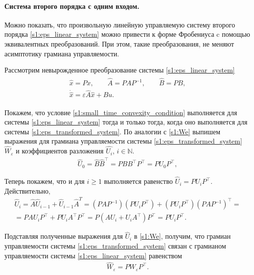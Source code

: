 \documentclass[../main.tex]{subfiles}
\begin{document}
\paragraph{Система второго порядка с одним входом.}
Можно показать, что произвольную линейную управляемую систему второго порядка \eqref{s1:eps_linear_system} можно привести к форме Фробениуса c помощью эквивалентных преобразований.
При этом, такие преобразования, не меняют асимптотику грамиана управляемости.

Рассмотрим невырожденное преобразование системы \eqref{s1:eps_linear_system}
\begin{gather}\label{s1:eps_transformed_system}
\begin{gathered}
	\hat{x} = P x, \qquad \hat{A} = P A P^{-1}, \qquad \hat{B} = P B, \\
	\dot{\hat{x}} = \varepsilon \hat{A} \hat{x} + \hat{B} u. 
\end{gathered}
\end{gather}

Покажем, что условие \eqref{s1:small_time_convexity_condition} выполняется для системы \eqref{s1:eps_linear_system} тогда и только тогда, когда оно выполняется для системы \eqref{s1:eps_transformed_system}.
 По аналогии с \eqref{s1:We} выпишем выражения для грамиана управляемости системы \eqref{s1:eps_transformed_system} $\hat{W}_{\varepsilon}$  и коэффициентов разложения $\hat{U_i}$, $i \in \mathbb{N}$.
\begin{gather*}
	\hat{U}_0 = \hat{B} \hat{B}^{\top} = P B B^{\top} P^{\top} = P U_0 P^{\top}, 
\end{gather*}

Теперь покажем, что и для $i \geqslant 1$ выполняется  равенство $\hat{U}_i = P U_i P^{\top}$.
Действительно,
\begin{gather*}
	\hat{U}_i  = \hat{A} \hat{U}_{i-1} + \hat{U}_{i-1} \hat{A}^T = \left(P A P^{-1} \right)  \left(  P U_i P^{\top} \right)  +  \left(  P U_i P^{\top}\right) \left(P A P^{-1} \right)^{\top} = \\ 
	= P A U_i P^{\top}   +  P U_i A^{\top} P^{\top} = P \left( A U_i   +  U_i A^{\top} \right) P^{\top}  = P U_i P^{\top}.
\end{gather*}

Подставляя полученные выражения для $\hat{U}_i$ в \eqref{s1:We}, получим, что  грамиан управляемости  системы \eqref{s1:eps_transformed_system} связан с грамианом управляемости системы \eqref{s1:eps_linear_system} равенством
\begin{gather*}
	\hat{W}_{\varepsilon} = P W_{\varepsilon} P^{\top}.
\end{gather*}
\end{document}
